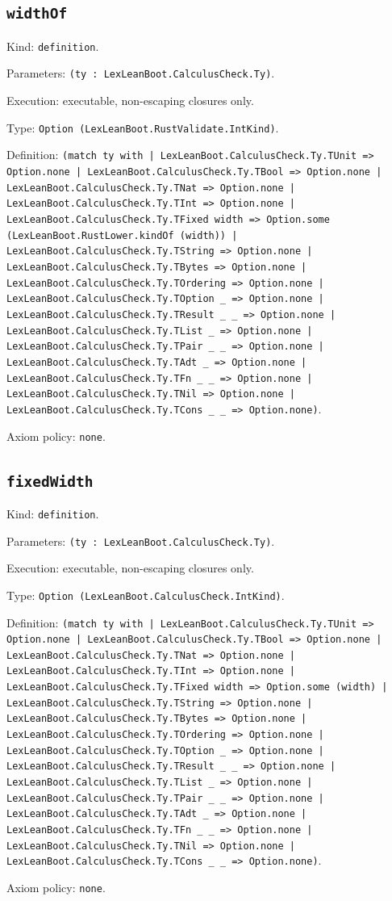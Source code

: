 \documentclass[11pt]{article}
\begin{document}
\subsection*{\texttt{widthOf}}
\noindent Kind: \texttt{definition}.\par
\noindent Parameters: \texttt{(ty : LexLeanBoot.CalculusCheck.Ty)}.\par
\noindent Execution: executable, non-escaping closures only.\par
\noindent Type: \texttt{Option (LexLeanBoot.RustValidate.IntKind)}.\par
\noindent Definition: \texttt{(match ty with | LexLeanBoot.CalculusCheck.Ty.TUnit => Option.none | LexLeanBoot.CalculusCheck.Ty.TBool => Option.none | LexLeanBoot.CalculusCheck.Ty.TNat => Option.none | LexLeanBoot.CalculusCheck.Ty.TInt => Option.none | LexLeanBoot.CalculusCheck.Ty.TFixed width => Option.some (LexLeanBoot.RustLower.kindOf (width)) | LexLeanBoot.CalculusCheck.Ty.TString => Option.none | LexLeanBoot.CalculusCheck.Ty.TBytes => Option.none | LexLeanBoot.CalculusCheck.Ty.TOrdering => Option.none | LexLeanBoot.CalculusCheck.Ty.TOption \_ => Option.none | LexLeanBoot.CalculusCheck.Ty.TResult \_ \_ => Option.none | LexLeanBoot.CalculusCheck.Ty.TList \_ => Option.none | LexLeanBoot.CalculusCheck.Ty.TPair \_ \_ => Option.none | LexLeanBoot.CalculusCheck.Ty.TAdt \_ => Option.none | LexLeanBoot.CalculusCheck.Ty.TFn \_ \_ => Option.none | LexLeanBoot.CalculusCheck.Ty.TNil => Option.none | LexLeanBoot.CalculusCheck.Ty.TCons \_ \_ => Option.none)}.\par
\noindent Axiom policy: \texttt{none}.\par
\subsection*{\texttt{fixedWidth}}
\noindent Kind: \texttt{definition}.\par
\noindent Parameters: \texttt{(ty : LexLeanBoot.CalculusCheck.Ty)}.\par
\noindent Execution: executable, non-escaping closures only.\par
\noindent Type: \texttt{Option (LexLeanBoot.CalculusCheck.IntKind)}.\par
\noindent Definition: \texttt{(match ty with | LexLeanBoot.CalculusCheck.Ty.TUnit => Option.none | LexLeanBoot.CalculusCheck.Ty.TBool => Option.none | LexLeanBoot.CalculusCheck.Ty.TNat => Option.none | LexLeanBoot.CalculusCheck.Ty.TInt => Option.none | LexLeanBoot.CalculusCheck.Ty.TFixed width => Option.some (width) | LexLeanBoot.CalculusCheck.Ty.TString => Option.none | LexLeanBoot.CalculusCheck.Ty.TBytes => Option.none | LexLeanBoot.CalculusCheck.Ty.TOrdering => Option.none | LexLeanBoot.CalculusCheck.Ty.TOption \_ => Option.none | LexLeanBoot.CalculusCheck.Ty.TResult \_ \_ => Option.none | LexLeanBoot.CalculusCheck.Ty.TList \_ => Option.none | LexLeanBoot.CalculusCheck.Ty.TPair \_ \_ => Option.none | LexLeanBoot.CalculusCheck.Ty.TAdt \_ => Option.none | LexLeanBoot.CalculusCheck.Ty.TFn \_ \_ => Option.none | LexLeanBoot.CalculusCheck.Ty.TNil => Option.none | LexLeanBoot.CalculusCheck.Ty.TCons \_ \_ => Option.none)}.\par
\noindent Axiom policy: \texttt{none}.\par
\end{document}
